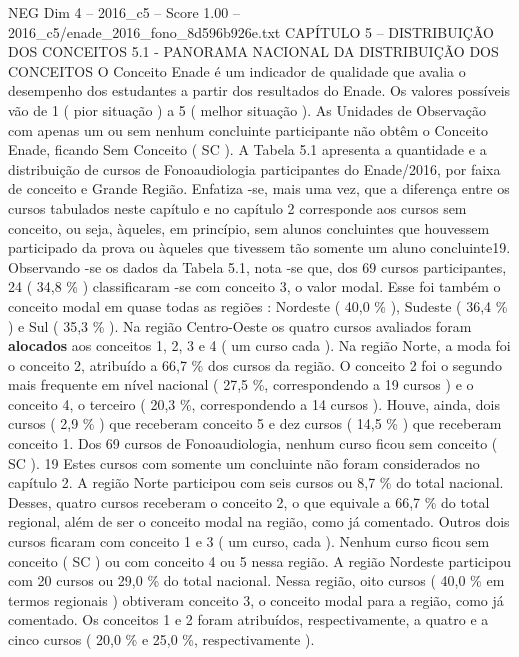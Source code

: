\begin{textsample}{NEG Dim 4 – 2016\_c5 – Score 1.00 – 2016\_c5/enade\_2016\_fono\_8d596b926e.txt}  \label{ex:f4_neg_249}
CAPÍTULO 5 – DISTRIBUIÇÃO DOS CONCEITOS 5.1 - PANORAMA NACIONAL DA DISTRIBUIÇÃO DOS CONCEITOS O Conceito Enade é um indicador de qualidade que avalia o desempenho dos estudantes a partir dos resultados do Enade.
Os valores possíveis vão de 1 ( pior situação ) a 5 ( melhor situação ).
As Unidades de Observação com apenas um ou sem nenhum concluinte participante não obtêm o Conceito Enade, ficando Sem Conceito ( SC ).
A Tabela 5.1 apresenta a quantidade e a distribuição de cursos de Fonoaudiologia participantes do Enade/2016, por faixa de conceito e Grande Região.
Enfatiza -se, mais uma vez, que a diferença entre os cursos tabulados neste capítulo e no capítulo 2 corresponde aos cursos sem conceito, ou seja, àqueles, em princípio, sem alunos concluintes que houvessem participado da prova ou àqueles que tivessem tão somente um aluno concluinte19.
Observando -se os dados da Tabela 5.1, nota -se que, dos 69 cursos participantes, 24 ( 34,8 \% ) classificaram -se com conceito 3, o valor modal.
Esse foi também o conceito modal em quase todas as regiões : Nordeste ( 40,0 \% ), Sudeste ( 36,4 \% ) e Sul ( 35,3 \% ).
Na região Centro-Oeste os quatro cursos avaliados foram \textbf{alocados} aos conceitos 1, 2, 3 e 4 ( um curso cada ).
Na região Norte, a moda foi o conceito 2, atribuído a 66,7 \% dos cursos da região.
O conceito 2 foi o segundo mais frequente em nível nacional ( 27,5 \%, correspondendo a 19 cursos ) e o conceito 4, o terceiro ( 20,3 \%, correspondendo a 14 cursos ).
Houve, ainda, dois cursos ( 2,9 \% ) que receberam conceito 5 e dez cursos ( 14,5 \% ) que receberam conceito 1.
Dos 69 cursos de Fonoaudiologia, nenhum curso ficou sem conceito ( SC ). 19 Estes cursos com somente um concluinte não foram considerados no capítulo 2.
A região Norte participou com seis cursos ou 8,7 \% do total nacional.
Desses, quatro cursos receberam o conceito 2, o que equivale a 66,7 \% do total regional, além de ser o conceito modal na região, como já comentado.
Outros dois cursos ficaram com conceito 1 e 3 ( um curso, cada ).
Nenhum curso ficou sem conceito ( SC ) ou com conceito 4 ou 5 nessa região.
A região Nordeste participou com 20 cursos ou 29,0 \% do total nacional.
Nessa região, oito cursos ( 40,0 \% em termos regionais ) obtiveram conceito 3, o conceito modal para a região, como já comentado.
Os conceitos 1 e 2 foram atribuídos, respectivamente, a quatro e a cinco cursos ( 20,0 \% e 25,0 \%, respectivamente ).

\end{textsample}
